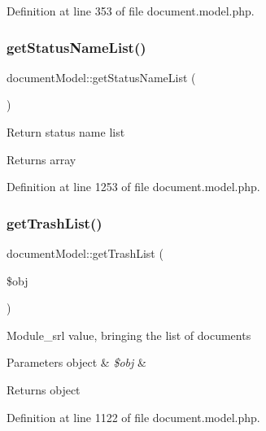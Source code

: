 Definition at line 353 of file document.\+model.\+php.

\mbox{\label{classdocumentModel_a47541348b4212971ce508fb2a24ce4f3}} 
\subsubsection{\texorpdfstring{get\+Status\+Name\+List()}{getStatusNameList()}}
{\footnotesize\ttfamily document\+Model\+::get\+Status\+Name\+List (\begin{DoxyParamCaption}{ }\end{DoxyParamCaption})}

Return status name list \begin{DoxyReturn}{Returns}
array 
\end{DoxyReturn}


Definition at line 1253 of file document.\+model.\+php.

\mbox{\label{classdocumentModel_a428c7beb4eb06031f1412a58c017ea20}} 
\subsubsection{\texorpdfstring{get\+Trash\+List()}{getTrashList()}}
{\footnotesize\ttfamily document\+Model\+::get\+Trash\+List (\begin{DoxyParamCaption}\item[{}]{\$obj }\end{DoxyParamCaption})}

Module\+\_\+srl value, bringing the list of documents 
\begin{DoxyParams}[1]{Parameters}
object & {\em \$obj} & \\
\hline
\end{DoxyParams}
\begin{DoxyReturn}{Returns}
object 
\end{DoxyReturn}


Definition at line 1122 of file document.\+model.\+php.

\mbox{\label{classdocumentModel_a04a1f3814d77f78a588c61ab78ef1274}} 
